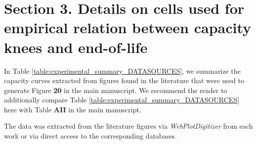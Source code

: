 \documentclass[journal=jpclcd,manuscript=article]{achemso}
\newcommand{\gbox}[1]{{
\fbox{
\parbox{0.8\textwidth}{  \fbox{$\triangleright$\textcolor{blue}{\textbf{Gon}:}} 
#1
}}}}
\begin{document}

\section{Section 3. Details on cells used for empirical relation between capacity knees and end-of-life}


In Table \ref{table:experimental_summary_DATASOURCES}, we summarize the capacity curves extracted from figures found in the literature that were used to generate Figure \textbf{20} 
in the main manuscript. We recommend the reader to additionally compare Table \ref{table:experimental_summary_DATASOURCES} here with Table \textbf{AII} in the main manuscript.

The data was extracted from the literature figures via \textit{WebPlotDigitizer}\cite{dos_reis_lithium-ion_2021} from each work  
or via direct access to the corresponding databases\cite{baumhofer_production_2014,diao_accelerated_2019,severson_data-driven_2019,willenberg_high-precision_2020,attia_closed-loop_2020}. 
\end{document}
